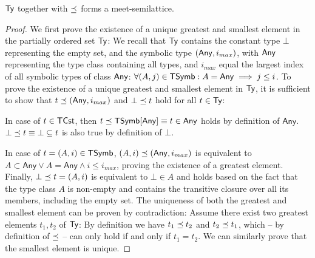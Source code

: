 \begin{proposition}
	$\mathsf{Ty}$ together with $\preceq$ forms a meet-semilattice.
\end{proposition}
\begin{proof}
	We first prove the existence of a unique greatest and smallest element in the partially ordered set $\mathsf{Ty}$: We recall that $\mathsf{Ty}$ contains the constant type $\bot$ representing the empty set, and the symbolic type $(\mathsf{Any}, i_{max})$, with $\mathsf{Any}$ representing the type class containing all types, and $i_{max}$ equal the largest index of all symbolic types of class $\mathsf{Any}$: $\forall (A,j) \in \mathsf{TSymb}: A = \mathsf{Any} \implies j \leq i$. To prove the existence of a unique greatest and smallest element in $\mathsf{Ty}$, it is sufficient to show that $t \preceq (\mathsf{Any}, i_{max})$ and $\bot \preceq t$ hold for all $t \in \mathsf{Ty}$:

	In case of $t \in \mathsf{TCst}$, then $t \preceq \mathsf{TSymb[Any]} \equiv t \in \mathsf{Any}$ holds by definition of $\mathsf{Any}$. $\bot \preceq t \equiv \bot \subseteq t$ is also true by definition of $\bot$.

	In case of $t = (A,i) \in \mathsf{TSymb}$, $(A,i) \preceq (\mathsf{Any}, i_{max})$ is equivalent to $A \subset \mathsf{Any} \lor A = \mathsf{Any} \land i \leq i_{max}$, proving the existence of a greatest element. Finally, $\bot \preceq t=(A, i)$ is equivalent to $\bot \in A$ and holds based on the fact that the type class $A$ is non-empty and contains the transitive closure over all its members, including the empty set. The uniqueness of both the greatest and smallest element can be proven by contradiction: Assume there exist two greatest elements $t_1, t_2$ of $\mathsf{Ty}$: By definition we have $t_1 \preceq t_2$ and $t_2 \preceq t_1$, which -- by definition of $\preceq$ -- can only hold if and only if $t_1 = t_2$. We can similarly prove that the smallest element is unique.


\end{proof}
